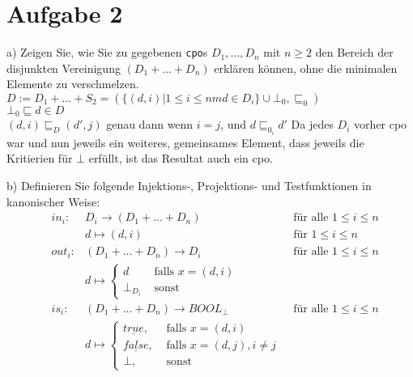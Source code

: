 \documentclass[ngerman,a4paper]{report}
\begin{document}
\section*{Aufgabe 2}
\begin{compactenum}
\item[a)] Zeigen Sie, wie Sie zu gegebenen \lstinline!cpo!s $D_1,...,D_n$ mit $n\geq 2$ den Bereich der disjunkten Vereinigung $(D_1 + ... + D_n)$ erklären können, ohne die minimalen Elemente zu verschmelzen.\\

	$D:= D_1+...+S_2 = (\lbrace (d,i)| 1\leq i \leq nm d \in D_i \rbrace \cup \bot_0, \sqsubseteq_0)$\\
	$\bot_0 \sqsubseteq d \in D$\\
	$(d,i) \sqsubseteq_D (d',j)$ genau dann wenn $ i=j$, und $ d\sqsubseteq_{0_i}d'$
Da jedes $D_i$ vorher cpo war und nun jeweils ein weiteres, gemeinsames Element, dass jeweils die Kritierien für $\bot$ erfüllt, ist das Resultat auch ein cpo.
\item[b)] Definieren Sie folgende Injektions-, Projektions- und Testfunktionen in kanonischer Weise:\\
%
%
	\begin{align*}
		&in_i:& D_i \rightarrow (D_1+...+D_n)& \text{ für alle } 1\leq i\leq n\\
		&& d \mapsto (d,i)& \text{ für } 1 \leq i \leq n\\
		&out_i:& (D_1+...+D_n)\rightarrow D_i& \text{ für alle } 1\leq i\leq n\\
		&& d \mapsto \begin{cases} d & \text{ falls } x=(d,i)\\ \bot_{D_i} & \text{ sonst }\end{cases}\\
		&is_i:& (D_1+...+D_n)\rightarrow BOOL_\bot& \text{ für alle } 1\leq i\leq n\\
		&& d \mapsto \begin{cases} \underline{true},& \text{ falls } x=(d,i)\\ \underline{false},& \text{ falls } x = (d,j), i \neq j\\ \bot,& \text{ sonst } \end{cases}
	\end{align*}


\end{compactenum}
\end{document}
